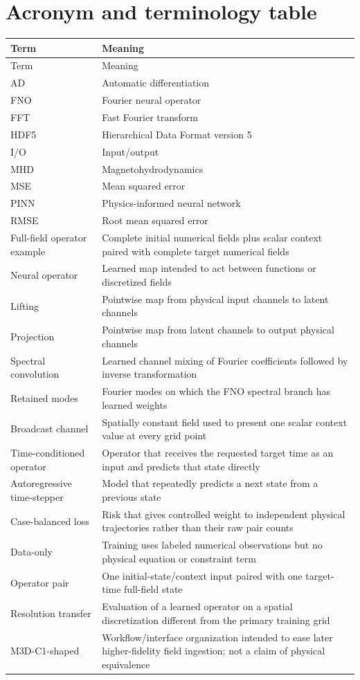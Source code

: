 \documentclass[11pt]{article}
\begin{document}
\section{Acronym and terminology table}
\label{app:terms}

\begin{longtable}{p{}p{}}
\toprule
Term & Meaning \\
\midrule
\endfirsthead
\toprule
Term & Meaning \\
\midrule
\endhead
AD & Automatic differentiation \\
FNO & Fourier neural operator \\
FFT & Fast Fourier transform \\
HDF5 & Hierarchical Data Format version 5 \\
I/O & Input/output \\
MHD & Magnetohydrodynamics \\
MSE & Mean squared error \\
PINN & Physics-informed neural network \\
RMSE & Root mean squared error \\
Full-field operator example & Complete initial numerical fields plus scalar context paired with complete target numerical fields \\
Neural operator & Learned map intended to act between functions or discretized fields \\
Lifting & Pointwise map from physical input channels to latent channels \\
Projection & Pointwise map from latent channels to output physical channels \\
Spectral convolution & Learned channel mixing of Fourier coefficients followed by inverse transformation \\
Retained modes & Fourier modes on which the FNO spectral branch has learned weights \\
Broadcast channel & Spatially constant field used to present one scalar context value at every grid point \\
Time-conditioned operator & Operator that receives the requested target time as an input and predicts that state directly \\
Autoregressive time-stepper & Model that repeatedly predicts a next state from a previous state \\
Case-balanced loss & Risk that gives controlled weight to independent physical trajectories rather than their raw pair counts \\
Data-only & Training uses labeled numerical observations but no physical equation or constraint term \\
Operator pair & One initial-state/context input paired with one target-time full-field state \\
Resolution transfer & Evaluation of a learned operator on a spatial discretization different from the primary training grid \\
M3D-C1-shaped & Workflow/interface organization intended to ease later higher-fidelity field ingestion; not a claim of physical equivalence \\
\bottomrule
\end{longtable}
\end{document}
